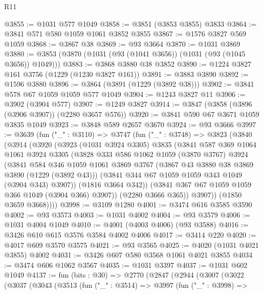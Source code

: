\begin{lexlean}{R11}
\begin{coremodule}
@3855 := @1031 @577 @1049
@3858 := @3851 (@3853 @3855) @3833
@3864 := @3841 @571 @580 @1059 @1061 @3852 @3855
@3867 := @1576 @3827 @569 @1059
@3868 := @3867 @38
@3869 := @93 @3664
@3870 := @1031 @3869
@3880 := @3853 (@3870 (@1031 (@93 (@1041 @3656)) (@1031 (@93 (@1045 @3656)) @1049)))
@3883 := @3868 @3880 @38 @3852
@3890 := @1224 @3827 @161 @3756 (@1229 (@1230 @3827 @161))
@3891 := @3883 @3890
@3892 := @1596 @3880
@3896 := @3864 (@3891 (@1229 (@3892 @38)))
@3902 := @3841 @578 @67 @1059 @1059 @577 @1049
@3904 := @1243 @3827 @11
@3906 := @3902 (@3904 @577)
@3907 := @1249 @3827
@3914 := @3847 (@3858 (@3896 (@3906 @3907)) (@2280 @3657 @576))
@3920 := @3841 @590 @67 @3671 @1059 @3835 @1049
@3923 := @3848 @589 @2657 @3670
@3924 := @93 @3666
@3997 := @3639
    (fun ("_" : @3110) =>
    @3747
      (fun ("_" : @3748) =>
      @3823
        (@3840
          (@3914
            (@3920
              (@3923
                (@1031 @3924 @3305)
                @3835
                (@3841
                  @587
                  @369
                  @1064
                  @1061
                  @3924
                  @3305
                  (@3828
                    @333
                    @586
                    @1062
                    @1059
                    (@3870 @3767)
                    @3924
                    (@3841
                      @584
                      @346
                      @1059
                      @1061
                      @3869
                      @3767
                      (@3867 @43 @3880 @38 @3869 @3890 (@1229 (@3892 @43)))
                      (@3841 @344 @67 @1059 @1059 @343 @1049 (@3904 @343) @3907))
                    (@1816 @3664 @342))
                  (@3841 @367 @67 @1059 @1059 @366 @1049 (@3904 @366) @3907))
                (@2280 @3666 @365))
              @3907))
          (@1850 @3659 @3668))))
@3998 := @3109 @1280
@4001 := @3474 @616 @3585 @3590
@4002 := @93 @3573
@4003 := @1031 @4002
@4004 := @93 @3579
@4006 := @1031 @4004 @1049
@4010 := @4001 (@4003 @4006) (@93 @3588)
@4016 := @3426 @610 @615 @3576 @3584 @4002 @4006
@4017 := @3414 @220
@4020 := @4017 @609 @3570 @3575
@4021 := @93 @3565
@4025 := @4020 (@1031 @4021 @3855) @4002
@4031 := @3426 @607 @580 @3568 @1061 @4021 @3855
@4034 := @3474 @606 @1062 @3567
@4035 := @1031 @3397
@4037 := @1031 @602 @1049
@4137 := fun (bits : @30) =>
  @2770
    (@2847
      (@2944
        (@3007
          (@3022
            (@3037
              (@3043
                (@3513
                  (fun ("_" : @3514) =>
                  @3997
                    (fun ("_" : @3998) =>

\end{coremodule}
\end{lexlean}
